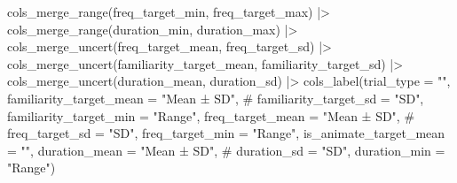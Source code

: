\documentclass[
  letterpaper,
  DIV=11,
  numbers=noendperiod]{scrartcl}
\newenvironment{Shaded}{\begin{snugshade}}{\end{snugshade}}
\newcommand{\AttributeTok}[1]{\textcolor[rgb]{0.40,0.45,0.13}{#1}}
\newcommand{\CommentTok}[1]{\textcolor[rgb]{0.37,0.37,0.37}{#1}}
\newcommand{\FunctionTok}[1]{\textcolor[rgb]{0.28,0.35,0.67}{#1}}
\newcommand{\NormalTok}[1]{\textcolor[rgb]{0.00,0.23,0.31}{#1}}
\newcommand{\SpecialCharTok}[1]{\textcolor[rgb]{0.37,0.37,0.37}{#1}}
\newcommand{\StringTok}[1]{\textcolor[rgb]{0.13,0.47,0.30}{#1}}
\begin{document}
\begin{Shaded}
\begin{Highlighting}[]
    \FunctionTok{cols\_merge\_range}\NormalTok{(freq\_target\_min, freq\_target\_max) }\SpecialCharTok{|\textgreater{}} 
    \FunctionTok{cols\_merge\_range}\NormalTok{(duration\_min, duration\_max) }\SpecialCharTok{|\textgreater{}}
    \FunctionTok{cols\_merge\_uncert}\NormalTok{(freq\_target\_mean, freq\_target\_sd) }\SpecialCharTok{|\textgreater{}} 
    \FunctionTok{cols\_merge\_uncert}\NormalTok{(familiarity\_target\_mean, familiarity\_target\_sd) }\SpecialCharTok{|\textgreater{}} 
    \FunctionTok{cols\_merge\_uncert}\NormalTok{(duration\_mean, duration\_sd) }\SpecialCharTok{|\textgreater{}} 
    \FunctionTok{cols\_label}\NormalTok{(}\AttributeTok{trial\_type =} \StringTok{""}\NormalTok{,}
               \AttributeTok{familiarity\_target\_mean =} \StringTok{"Mean ± SD"}\NormalTok{,}
               \CommentTok{\# familiarity\_target\_sd = "SD",}
               \AttributeTok{familiarity\_target\_min =} \StringTok{"Range"}\NormalTok{,}
               \AttributeTok{freq\_target\_mean =} \StringTok{"Mean ± SD"}\NormalTok{,}
               \CommentTok{\# freq\_target\_sd = "SD",}
               \AttributeTok{freq\_target\_min =} \StringTok{"Range"}\NormalTok{,}
               \AttributeTok{is\_animate\_target\_mean =} \StringTok{""}\NormalTok{,}
               \AttributeTok{duration\_mean =} \StringTok{"Mean ± SD"}\NormalTok{,}
               \CommentTok{\# duration\_sd = "SD",}
               \AttributeTok{duration\_min =} \StringTok{"Range"}\NormalTok{) }
\end{Highlighting}
\end{Shaded}
\end{document}

